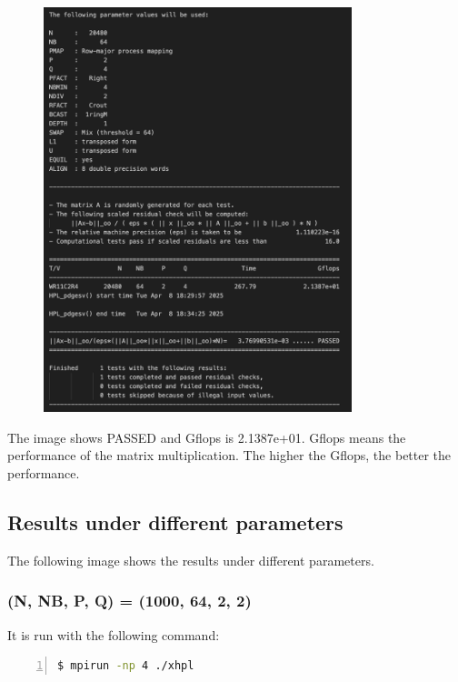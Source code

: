 \documentclass{article}
\begin{document}
\begin{figure}[htbp]
    \centering
    \includegraphics[width=0.8\textwidth]{./img/HPL.png}
\end{figure}

The image shows PASSED and Gflops is 2.1387e+01. Gflops means the performance of the matrix multiplication. The higher the Gflops, the better the performance.

\clearpage

\subsection*{Results under different parameters}

The following image shows the results under different parameters.

\subsubsection*{(N, NB, P, Q) = (1000, 64, 2, 2)}

It is run with the following command:

\begin{lstlisting}[language=bash, basicstyle=\ttfamily\small, numbers=left, numberstyle=\tiny\color{gray}, stepnumber=1, frame=single]
$ mpirun -np 4 ./xhpl
\end{lstlisting}
\end{document}
